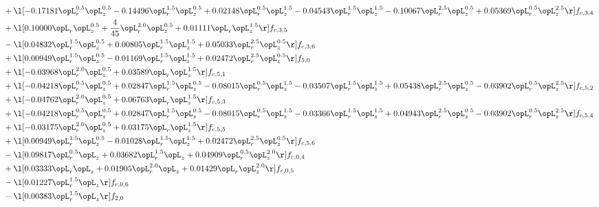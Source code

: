 \begin{alignat}{2}
& + \l[  -0.17181 \opL_r^{0.5} \opL_z^{0.5}   -0.14496 \opL_r^{1.5} \opL_z^{0.5} +  0.02148 \opL_r^{0.5} \opL_z^{1.5}   -0.04543 \opL_r^{1.5} \opL_z^{1.5}   -0.10067 \opL_r^{2.5} \opL_z^{0.5} +  0.05369 \opL_r^{0.5} \opL_z^{2.5}  \r] f_{c,3,4} \nonumber \\ 
& + \l[  0.10000 \opL_r \opL_z^{0.5} + \frac{4}{45} \opL_r^{2.0} \opL_z^{0.5} +  0.01111 \opL_r \opL_z^{1.5}  \r] f_{c,3,5} \nonumber \\ 
& - \l[  0.04832 \opL_r^{1.5} \opL_z^{0.5} +  0.00805 \opL_r^{1.5} \opL_z^{1.5} +  0.05033 \opL_r^{2.5} \opL_z^{0.5}  \r] f_{c,3,6} \nonumber \\ 
& + \l[  0.00949 \opL_r^{1.5} \opL_z^{0.5}   -0.01169 \opL_r^{1.5} \opL_z^{1.5} +  0.02472 \opL_r^{2.5} \opL_z^{0.5}  \r] f_{5,0} \nonumber \\ 
& + \l[  -0.03968 \opL_r^{2.0} \opL_z^{0.5} +  0.03589 \opL_r \opL_z^{1.5}  \r] f_{c,5,1} \nonumber \\ 
& + \l[  -0.04218 \opL_r^{0.5} \opL_z^{0.5} +  0.02847 \opL_r^{1.5} \opL_z^{0.5}   -0.08015 \opL_r^{0.5} \opL_z^{1.5}   -0.03507 \opL_r^{1.5} \opL_z^{1.5} +  0.05438 \opL_r^{2.5} \opL_z^{0.5}   -0.03902 \opL_r^{0.5} \opL_z^{2.5}  \r] f_{c,5,2} \nonumber \\ 
& + \l[  -0.04762 \opL_r^{2.0} \opL_z^{0.5} +  0.06763 \opL_r \opL_z^{1.5}  \r] f_{c,5,3} \nonumber \\ 
& + \l[  -0.04218 \opL_r^{0.5} \opL_z^{0.5} +  0.02847 \opL_r^{1.5} \opL_z^{0.5}   -0.08015 \opL_r^{0.5} \opL_z^{1.5}   -0.03366 \opL_r^{1.5} \opL_z^{1.5} +  0.04943 \opL_r^{2.5} \opL_z^{0.5}   -0.03902 \opL_r^{0.5} \opL_z^{2.5}  \r] f_{c,5,4} \nonumber \\ 
& + \l[  -0.03175 \opL_r^{2.0} \opL_z^{0.5} +  0.03175 \opL_r \opL_z^{1.5}  \r] f_{c,5,5} \nonumber \\ 
& + \l[  0.00949 \opL_r^{1.5} \opL_z^{0.5}   -0.01028 \opL_r^{1.5} \opL_z^{1.5} +  0.02472 \opL_r^{2.5} \opL_z^{0.5}  \r] f_{c,5,6} \nonumber \\ 
& - \l[  0.09817 \opL_r^{0.5} \opL_z +  0.03682 \opL_r^{1.5} \opL_z +  0.04909 \opL_r^{0.5} \opL_z^{2.0}  \r] f_{c,0,4} \nonumber \\ 
& + \l[  0.03333 \opL_r \opL_z +  0.01905 \opL_r^{2.0} \opL_z +  0.01429 \opL_r \opL_z^{2.0}  \r] f_{c,0,5} \nonumber \\ 
& - \l[  0.01227 \opL_r^{1.5} \opL_z  \r] f_{c,0,6} \nonumber \\ 
& - \l[  0.00383 \opL_r^{1.5} \opL_z  \r] f_{2,0} \nonumber \\ 

\end{alignat}
